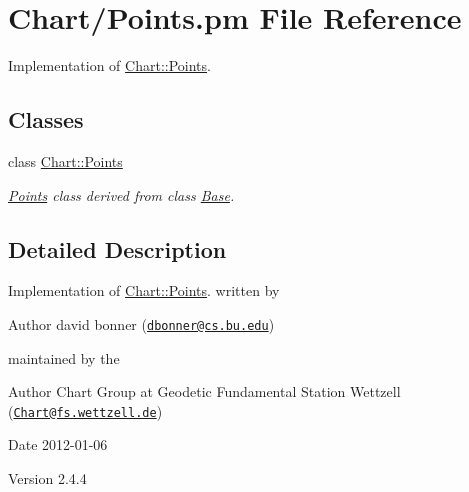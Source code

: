 \hypertarget{Points_8pm}{
\section{Chart/Points.pm File Reference}
\label{Points_8pm}
}


Implementation of \hyperlink{classChart_1_1Points}{Chart::Points}.  


\subsection*{Classes}
\begin{DoxyCompactItemize}
\item 
class \hyperlink{classChart_1_1Points}{Chart::Points}
\begin{DoxyCompactList}\small\item\em \hyperlink{classChart_1_1Points}{Points} class derived from class \hyperlink{classChart_1_1Base}{Base}. \item\end{DoxyCompactList}\end{DoxyCompactItemize}


\subsection{Detailed Description}
Implementation of \hyperlink{classChart_1_1Points}{Chart::Points}. written by \begin{DoxyAuthor}{Author}
david bonner (\href{mailto:dbonner@cs.bu.edu}{\tt dbonner@cs.bu.edu})
\end{DoxyAuthor}
maintained by the \begin{DoxyAuthor}{Author}
Chart Group at Geodetic Fundamental Station Wettzell (\href{mailto:Chart@fs.wettzell.de}{\tt Chart@fs.wettzell.de}) 
\end{DoxyAuthor}
\begin{DoxyDate}{Date}
2012-\/01-\/06 
\end{DoxyDate}
\begin{DoxyVersion}{Version}
2.4.4 
\end{DoxyVersion}
